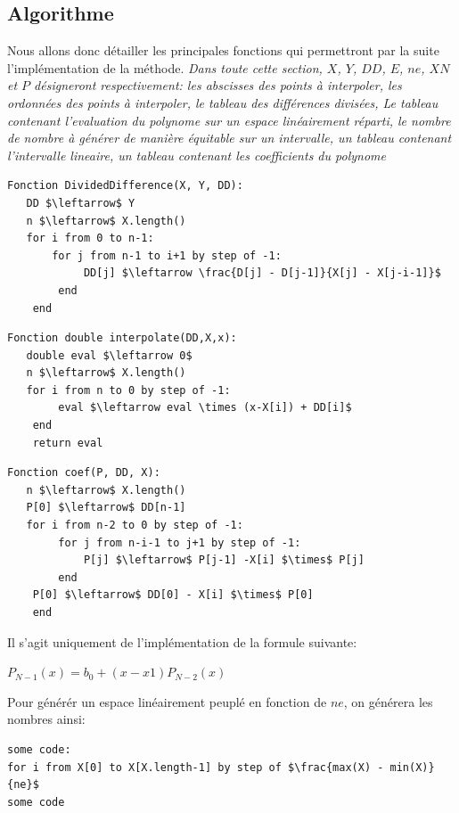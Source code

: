 \subsection{Algorithme}
Nous allons donc détailler les principales fonctions qui permettront par la suite l'implémentation de la méthode.
\textit{Dans toute cette section, $X$, $Y$, $DD$, $E$, $ne$, $XN$ et $P$ désigneront respectivement: les abscisses des points à interpoler, les ordonnées des points à interpoler, le tableau des différences divisées, Le tableau contenant l'evaluation du polynome sur un espace linéairement réparti, le nombre de nombre à générer de manière équitable sur un intervalle, un tableau contenant l'intervalle lineaire, un tableau contenant les coefficients du polynome}
\begin{lstlisting}[mathescape=true, frame=single, basicstyle=\linespread{1.5}\fontsize{8}{10}\selectfont, caption="Divided Difference function"]
Fonction DividedDifference(X, Y, DD):
   DD $\leftarrow$ Y
   n $\leftarrow$ X.length()
   for i from 0 to n-1:
   	   for j from n-1 to i+1 by step of -1:
   	   		DD[j] $\leftarrow \frac{D[j] - D[j-1]}{X[j] - X[j-i-1]}$
		end
    end
\end{lstlisting}
\begin{lstlisting}[mathescape=true, frame=single, basicstyle=\linespread{1.5}\fontsize{8}{10}\selectfont, caption="interpolate function"]
Fonction double interpolate(DD,X,x):
   double eval $\leftarrow 0$
   n $\leftarrow$ X.length()
   for i from n to 0 by step of -1:
   		eval $\leftarrow eval \times (x-X[i]) + DD[i]$
   	end
   	return eval
\end{lstlisting}
\begin{lstlisting}[mathescape=true, frame=single, basicstyle=\linespread{1.5}\fontsize{8}{10}\selectfont, caption="find coefficient function"]
Fonction coef(P, DD, X):
   n $\leftarrow$ X.length()
   P[0] $\leftarrow$ DD[n-1]
   for i from n-2 to 0 by step of -1:
   		for j from n-i-1 to j+1 by step of -1:
   			P[j] $\leftarrow$ P[j-1] -X[i] $\times$ P[j]
   		end
   	P[0] $\leftarrow$ DD[0] - X[i] $\times$ P[0]
   	end
\end{lstlisting}
Il s'agit uniquement de l'implémentation de la formule suivante:
\begin{center}
 $P_{N-1}(x) = b_0 + (x-x1)P_{N-2}(x)$
\end{center}
Pour générér un espace linéairement peuplé en fonction de $ne$, on générera les nombres ainsi:
\begin{lstlisting}[mathescape=true, frame=single, basicstyle=\linespread{1.5}\fontsize{8}{10}\selectfont, caption="generate linear space"]
some code:
for i from X[0] to X[X.length-1] by step of $\frac{max(X) - min(X)}{ne}$
some code
\end{lstlisting}
